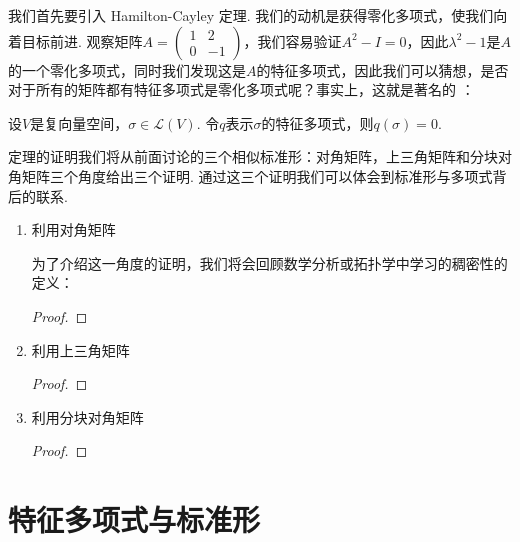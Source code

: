 我们首先要引入 Hamilton-Cayley 定理. 我们的动机是获得零化多项式，使我们向着目标前进. 观察矩阵$A=\begin{pmatrix}
        1 & 2 \\ 0 & -1
    \end{pmatrix}$，我们容易验证$A^2-I=0$，因此$\lambda^2-1$是$A$的一个零化多项式，同时我们发现这是$A$的特征多项式，因此我们可以猜想，是否对于所有的矩阵都有特征多项式是零化多项式呢？事实上，这就是著名的 ：
\begin{theorem} \label{thm:21:HC} 
    设$V$是复向量空间，$\sigma\in \mathcal{L}(V)$. 令$q$表示$\sigma$的特征多项式，则$q(\sigma)=0$.
\end{theorem}
定理的证明我们将从前面讨论的三个相似标准形：对角矩阵，上三角矩阵和分块对角矩阵三个角度给出三个证明. 通过这三个证明我们可以体会到标准形与多项式背后的联系.

\begin{enumerate}
    \item 利用对角矩阵

          为了介绍这一角度的证明，我们将会回顾数学分析或拓扑学中学习的稠密性的定义：
          \begin{definition}

          \end{definition}

          \begin{lemma}

          \end{lemma}

          \begin{proof}

          \end{proof}

    \item 利用上三角矩阵

          \begin{proof}

          \end{proof}

    \item 利用分块对角矩阵

          \begin{proof}

          \end{proof}
\end{enumerate}

\section{特征多项式与标准形}
